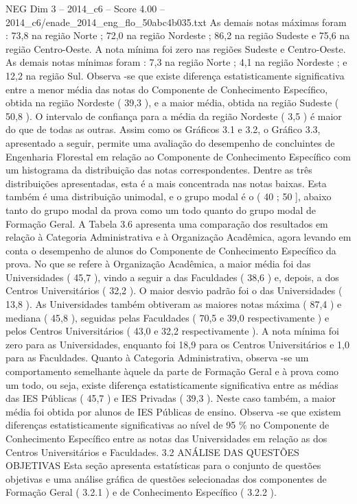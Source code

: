 \begin{textsample}{NEG Dim 3 – 2014\_c6 – Score 4.00 – 2014\_c6/enade\_2014\_eng\_flo\_50abc4b035.txt}
As demais notas máximas foram : 73,8 na região Norte ; 72,0 na região Nordeste ; 86,2 na região Sudeste e 75,6 na região Centro-Oeste.
A nota mínima foi zero nas regiões Sudeste e Centro-Oeste.
As demais notas mínimas foram : 7,3 na região Norte ; 4,1 na região Nordeste ; e 12,2 na região Sul.
Observa -se que existe diferença estatisticamente significativa entre a menor média das notas do Componente de Conhecimento Específico, obtida na região Nordeste ( 39,3 ), e a maior média, obtida na região Sudeste ( 50,8 ).
O intervalo de confiança para a média da região Nordeste ( 3,5 ) é maior do que de todas as outras.
Assim como os Gráficos 3.1 e 3.2, o Gráfico 3.3, apresentado a seguir, permite uma avaliação do desempenho de concluintes de Engenharia Florestal em relação ao Componente de Conhecimento Específico com um histograma da distribuição das notas correspondentes.
Dentre as três distribuições apresentadas, esta é a mais concentrada nas notas baixas.
Esta também é uma distribuição unimodal, e o grupo modal é o ( 40 ; 50 ], abaixo tanto do grupo modal da prova como um todo quanto do grupo modal de Formação Geral.
A Tabela 3.6 apresenta uma comparação dos resultados em relação à Categoria Administrativa e à Organização Acadêmica, agora levando em conta o desempenho de alunos do Componente de Conhecimento Específico da prova.
No que se refere à Organização Acadêmica, a maior média foi das Universidades ( 45,7 ), vindo a seguir a das Faculdades ( 38,6 ) e, depois, a dos Centros Universitários ( 32,2 ).
O maior desvio padrão foi o das Universidades ( 13,8 ).
As Universidades também obtiveram as maiores notas máxima ( 87,4 ) e mediana ( 45,8 ), seguidas pelas Faculdades ( 70,5 e 39,0 respectivamente ) e pelos Centros Universitários ( 43,0 e 32,2 respectivamente ).
A nota mínima foi zero para as Universidades, enquanto foi 18,9 para os Centros Universitários e 1,0 para as Faculdades.
Quanto à Categoria Administrativa, observa -se um comportamento semelhante àquele da parte de Formação Geral e à prova como um todo, ou seja, existe diferença estatisticamente significativa entre as médias das IES Públicas ( 45,7 ) e IES Privadas ( 39,3 ).
Neste caso também, a maior média foi obtida por alunos de IES Públicas de ensino.
Observa -se que existem diferenças estatisticamente significativas ao nível de 95 \% no Componente de Conhecimento Específico entre as notas das Universidades em relação as dos Centros Universitários e Faculdades. 3.2 ANÁLISE DAS QUESTÕES OBJETIVAS Esta seção apresenta estatísticas para o conjunto de questões objetivas e uma análise gráfica de questões selecionadas dos componentes de Formação Geral ( 3.2.1 ) e de Conhecimento Específico ( 3.2.2 ).

\end{textsample}
